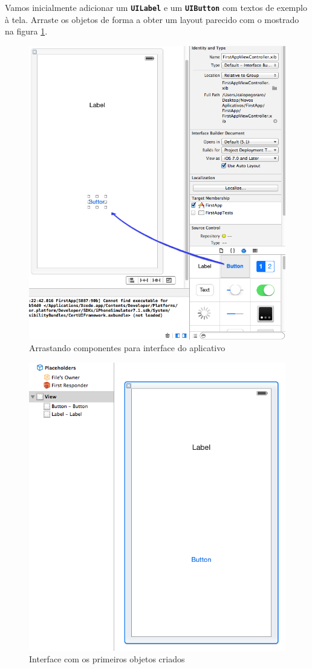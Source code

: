 \documentclass[a4paper,12pt,brazil,oneside]{book}
\begin{document}
Vamos inicialmente adicionar um \texttt{\textbf{UILabel}} e um \texttt{\textbf{UIButton}} com textos de exemplo à tela. Arraste os objetos de forma a obter um layout parecido com o mostrado na figura \ref{fig:arrastando_itens}.

\begin{figure}[H]
  \centering
  \includegraphics[width=.75\textwidth]{figuras/3/tela_novo_projeto_19.png}
  \caption{Arrastando componentes para interface do aplicativo}
  \label{fig:arrastando_itens}
\end{figure}

\begin{figure}[H]
  \centering
  \includegraphics[width=.75\textwidth]{figuras/3/tela_novo_projeto_16.png}
  \caption{Interface com os primeiros objetos criados}
  \label{fig:a}
\end{figure}
\end{document}
